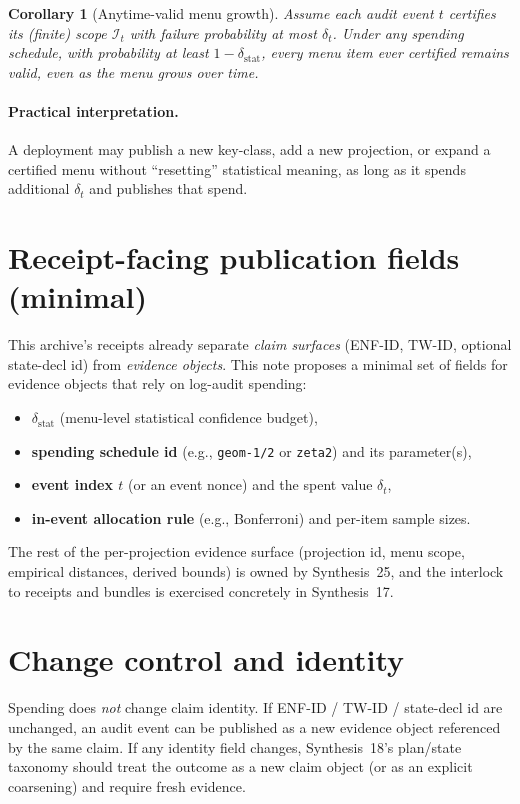 \documentclass[11pt]{article}
\newtheorem{corollary}{Corollary}
\begin{document}
\begin{corollary}[Anytime-valid menu growth]
\label{cor:growth}
Assume each audit event $t$ certifies its (finite) scope $\mathcal I_t$ with failure probability at most $\delta_t$.
Under any spending schedule, with probability at least $1-\delta_{\mathrm{stat}}$, \emph{every} menu item ever certified remains valid, even as the menu grows over time.
\end{corollary}

\paragraph{Practical interpretation.}
A deployment may publish a new key-class, add a new projection, or expand a certified menu without ``resetting'' statistical meaning, as long as it spends additional $\delta_t$ and publishes that spend.

\section{Receipt-facing publication fields (minimal)}
This archive's receipts already separate \emph{claim surfaces} (ENF-ID, TW-ID, optional state-decl id) from \emph{evidence objects}.\cite{series:receiptitems,series:contractobjects}
This note proposes a minimal set of fields for evidence objects that rely on log-audit spending:
\begin{itemize}[leftmargin=*]
\item \textbf{$\delta_{\mathrm{stat}}$} (menu-level statistical confidence budget),
\item \textbf{spending schedule id} (e.g., \texttt{geom-1/2} or \texttt{zeta2}) and its parameter(s),
\item \textbf{event index $t$} (or an event nonce) and the spent value $\delta_t$,
\item \textbf{in-event allocation rule} (e.g., Bonferroni) and per-item sample sizes.
\end{itemize}
The rest of the per-projection evidence surface (projection id, menu scope, empirical distances, derived bounds) is owned by Synthesis~25, and the interlock to receipts and bundles is exercised concretely in Synthesis~17.\cite{series:stataudit,series:workedexample}

\section{Change control and identity}
Spending does \emph{not} change claim identity.
If ENF-ID / TW-ID / state-decl id are unchanged, an audit event can be published as a new evidence object referenced by the same claim.
If any identity field changes, Synthesis~18's plan/state taxonomy should treat the outcome as a new claim object (or as an explicit coarsening) and require fresh evidence.\cite{series:planstateequiv}
\end{document}
